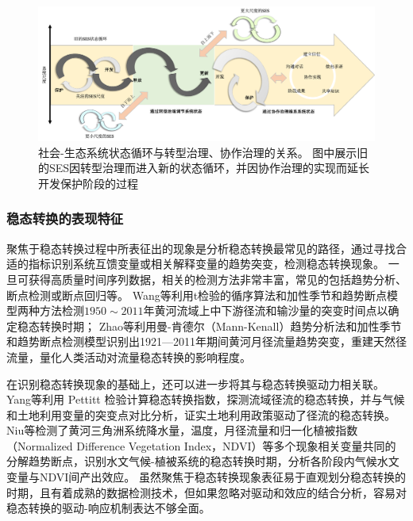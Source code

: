 \begin{figure}[htb] %
    \includegraphics[width=\textwidth]{img/ch1/ch1_governance_driver.png}
    \caption[社会-生态系统状态循环]{社会-生态系统状态循环与转型治理、协作治理的关系。
    图中展示旧的SES因转型治理而进入新的状态循环，并因协作治理的实现而延长开发保护阶段的过程}\label{ch1:fig:governance_driver}
\end{figure}

\subsubsection*{稳态转换的表现特征}

聚焦于稳态转换过程中所表征出的现象是分析稳态转换最常见的路径，通过寻找合适的指标识别系统互馈变量或相关解释变量的趋势突变，检测稳态转换现象。
一旦可获得高质量时间序列数据，相关的检测方法非常丰富，常见的包括趋势分析、断点检测或断点回归等。
Wang等利用t检验的循序算法和加性季节和趋势断点模型两种方法检测$1950 \sim 2011$年黄河流域上中下游径流和输沙量的突变时间点以确定稳态转换时期\cite{wang2014}；
Zhao等利用曼-肯德尔（Mann-Kenall）趋势分析法和加性季节和趋势断点检测模型识别出1921—2011年期间黄河月径流量趋势突变，重建天然径流量，量化人类活动对流量稳态转换的影响程度\cite{zhao2015}。

在识别稳态转换现象的基础上，还可以进一步将其与稳态转换驱动力相关联。
Yang等利用 Pettitt 检验计算稳态转换指数，探测流域径流的稳态转换，并与气候和土地利用变量的突变点对比分析，证实土地利用政策驱动了径流的稳态转换\cite{yang2012a}。
Niu等检测了黄河三角洲系统降水量，温度，月径流量和归一化植被指数（Normalized Difference Vegetation Index，NDVI）等多个现象相关变量共同的分解趋势断点，识别水文气候-植被系统的稳态转换时期，分析各阶段内气候水文变量与NDVI间产出效应\cite{niu2020}。
虽然聚焦于稳态转换现象表征易于直观划分稳态转换的时期，且有着成熟的数据检测技术，但如果忽略对驱动和效应的结合分析，容易对稳态转换的驱动-响应机制表达不够全面。

